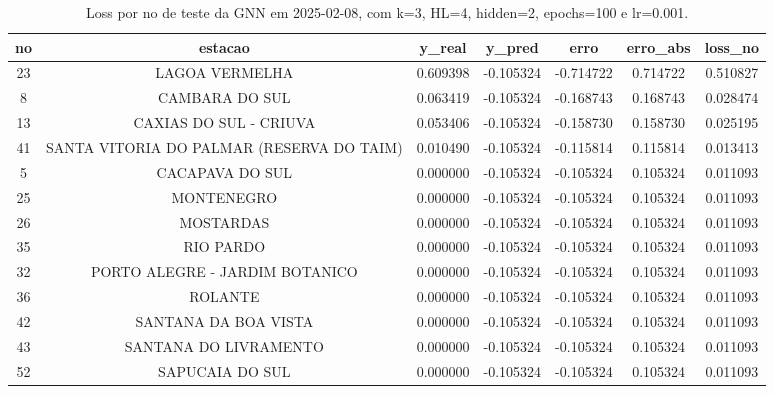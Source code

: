 \begin{table}[h]
\centering
\caption{Loss por no de teste da GNN em 2025-02-08, com k=3, HL=4, hidden=2, epochs=100 e lr=0.001.}
\label{tab:gnn_loss_k3_hl4_h2_e100_d20250208}
\begin{tabular}{ccccccc}
\toprule
no & estacao & y\_real & y\_pred & erro & erro\_abs & loss\_no \\
\midrule
23 & LAGOA VERMELHA & 0.609398 & -0.105324 & -0.714722 & 0.714722 & 0.510827 \\
8 & CAMBARA DO SUL & 0.063419 & -0.105324 & -0.168743 & 0.168743 & 0.028474 \\
13 & CAXIAS DO SUL - CRIUVA & 0.053406 & -0.105324 & -0.158730 & 0.158730 & 0.025195 \\
41 & SANTA VITORIA DO PALMAR (RESERVA DO TAIM) & 0.010490 & -0.105324 & -0.115814 & 0.115814 & 0.013413 \\
5 & CACAPAVA DO SUL & 0.000000 & -0.105324 & -0.105324 & 0.105324 & 0.011093 \\
25 & MONTENEGRO & 0.000000 & -0.105324 & -0.105324 & 0.105324 & 0.011093 \\
26 & MOSTARDAS & 0.000000 & -0.105324 & -0.105324 & 0.105324 & 0.011093 \\
35 & RIO PARDO & 0.000000 & -0.105324 & -0.105324 & 0.105324 & 0.011093 \\
32 & PORTO ALEGRE - JARDIM BOTANICO & 0.000000 & -0.105324 & -0.105324 & 0.105324 & 0.011093 \\
36 & ROLANTE & 0.000000 & -0.105324 & -0.105324 & 0.105324 & 0.011093 \\
42 & SANTANA DA BOA VISTA & 0.000000 & -0.105324 & -0.105324 & 0.105324 & 0.011093 \\
43 & SANTANA DO LIVRAMENTO & 0.000000 & -0.105324 & -0.105324 & 0.105324 & 0.011093 \\
52 & SAPUCAIA DO SUL & 0.000000 & -0.105324 & -0.105324 & 0.105324 & 0.011093 \\
\bottomrule
\end{tabular}
\end{table}
